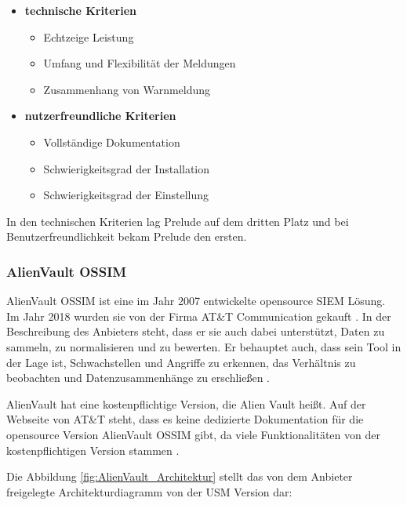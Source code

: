 \begin{itemize}[noitemsep]
   \item \textbf{technische Kriterien}
   \begin{itemize}[noitemsep]
      \item Echtzeige Leistung %
      \item Umfang und Flexibilität der Meldungen %
      \item Zusammenhang von Warnmeldung %
   \end{itemize}

   \item \textbf{nutzerfreundliche Kriterien}
   \begin{itemize}[noitemsep]
      \item Vollständige Dokumentation %
      \item Schwierigkeitsgrad der Installation %
      \item Schwierigkeitsgrad der Einstellung %
   \end{itemize}
\end{itemize}

In den technischen Kriterien lag Prelude auf dem dritten Platz und bei Benutzerfreundlichkeit bekam Prelude den ersten. 

\subsubsection{AlienVault OSSIM}
AlienVault OSSIM ist eine im Jahr 2007 entwickelte \gls{opensource} \gls{SIEM} Lösung. Im Jahr 2018 wurden sie von der Firma AT\&T Communication gekauft  \citep{CBN_AV}. In der Beschreibung des Anbieters steht, dass er sie auch dabei unterstützt, Daten zu sammeln, zu normalisieren und zu bewerten. Er behauptet auch, dass sein Tool in der Lage ist, Schwachstellen und Angriffe zu erkennen, das Verhältnis zu beobachten und Datenzusammenhänge zu erschließen \citep{ATT_AVO}. 

AlienVault hat eine kostenpflichtige Version, die Alien Vault  heißt. Auf der Webseite von AT\&T steht, dass es keine dedizierte Dokumentation für die \gls{opensource} Version AlienVault OSSIM gibt, da viele Funktionalitäten von der kostenpflichtigen Version stammen \citep{ATT_AVO}. 

\newpage
Die Abbildung \ref{fig:AlienVault_Architektur} stellt das von dem Anbieter freigelegte Architekturdiagramm von der \gls{USM} Version dar:

